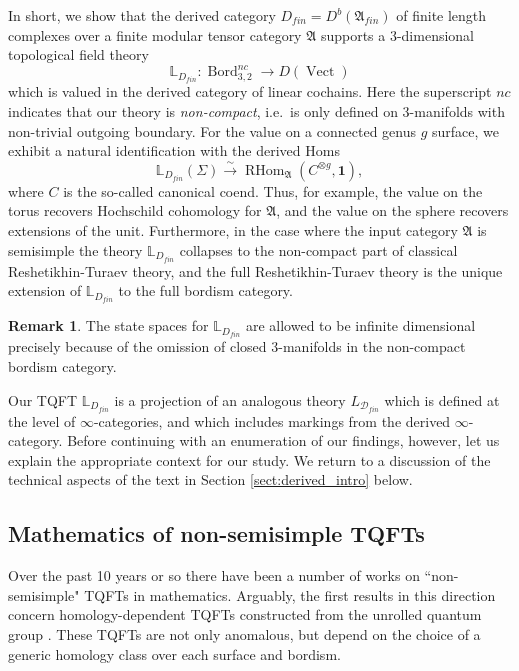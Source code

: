 \documentclass[reqno]{amsart}
\theoremstyle{definition}
\newtheorem{remark}[lemma]{Remark}
\newcommand{\mfk}[1]{\mathfrak{#1}}
\newcommand{\mbb}[1]{\mathbb{#1}}
\newcommand{\msc}[1]{\mathscr{#1}}
\newcommand{\opn}[1]{\operatorname{#1}}
\newcommand{\ot}{\otimes}
\DeclareMathOperator{\Bord}{Bord}
\renewcommand{\1}{\mathbf{1}}
\begin{document}
In short, we show that the derived category $D_{fin}=D^b(\mfk{A}_{fin})$ of finite length complexes over a finite modular tensor category $\mfk{A}$ supports a $3$-dimensional topological field theory
\[
\mbb{L}_{D_{fin}}:\Bord_{3,2}^{nc}\to D(\opn{Vect})
\]
which is valued in the derived category of linear cochains. Here the superscript $nc$ indicates that our theory is \emph{non-compact}, i.e.\ is only defined on $3$-manifolds with non-trivial outgoing boundary.  For the value on a connected genus $g$ surface, we exhibit a natural identification with the derived Homs
\[
\mbb{L}_{D_{fin}}(\Sigma)\overset{\sim}\to \opn{RHom}_{\mfk{A}}(C^{\ot g},\1),
\]
where $C$ is the so-called canonical coend. Thus, for example, the value on the torus recovers Hochschild cohomology for $\mfk{A}$, and the value on the sphere recovers extensions of the unit. Furthermore, in the case where the input category $\mfk{A}$ is semisimple the theory $\mbb{L}_{D_{fin}}$ collapses to the non-compact part of classical Reshetikhin-Turaev theory, and the full Reshetikhin-Turaev theory is the unique extension of $\mbb{L}_{D_{fin}}$ to the full bordism category.

\begin{remark}
The state spaces for $\mbb{L}_{D_{fin}}$ are allowed to be infinite dimensional precisely because of the omission of closed $3$-manifolds in the non-compact bordism category.
\end{remark}

Our TQFT $\mbb{L}_{D_{fin}}$ is a projection of an analogous theory $L_{\msc{D}_{fin}}$ which is defined at the level of $\infty$-categories, and which includes markings from the derived $\infty$-category. Before continuing with an enumeration of our findings, however, let us explain the appropriate context for our study. We return to a discussion of the technical aspects of the text in Section \ref{sect:derived_intro} below.

\subsection{Mathematics of non-semisimple TQFTs}

Over the past 10 years or so there have been a number of works on ``non-semisimple" TQFTs in mathematics.  Arguably, the first results in this direction concern homology-dependent TQFTs constructed from the unrolled quantum group \cite{blanchetetal16,derenzigeermirand20}. These TQFTs are not only anomalous, but depend on the choice of a generic homology class over each surface and bordism.  
\par
\end{document}
